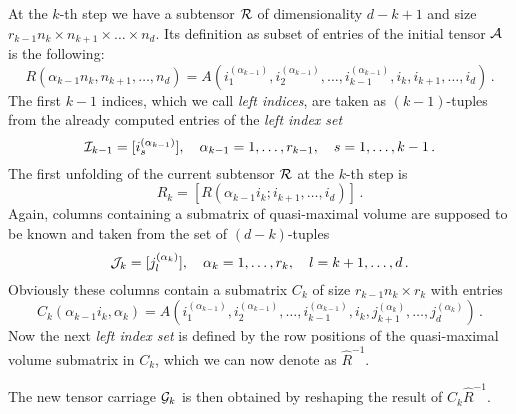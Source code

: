 At the $k$-th step we have a subtensor $\mathcal{R}$ of dimensionality $d-k+1$ and size $r_{k-1}n_k \times n_{k+1} \times \ldots \times n_d$. Its definition as subset of entries of the initial tensor $\mathcal{A}$ is the following:
\begin{equation*}
  R(\alpha_{k-1}n_k,n_{k+1},\ldots,n_d) = A(i_1^{(\alpha_{k-1})},i_2^{(\alpha_{k-1})},\ldots,i_{k-1}^{(\alpha_{k-1})},i_k,i_{k+1},\ldots,i_d)\, .
\end{equation*}
The first $k-1$ indices, which we call \emph{left indices}, are taken as $(k-1)$-tuples from the already computed entries of the \emph{left index set}
\begin{equation*}
  \mathcal{I}_{k-1} = [i_s^{(\alpha_{k-1})}],\quad \alpha_{k-1} = 1,\ldots,r_{k-1},\quad s = 1,\ldots,k-1\, .
\end{equation*}
The first unfolding of the current subtensor $\mathcal{R}$ at the $k$-th step is
\begin{equation*}
  R_k = [R(\alpha_{k-1}i_k;i_{k+1},\ldots,i_d)]\, .
\end{equation*}
Again, columns containing a submatrix of quasi-maximal volume are supposed to be known and taken from the set of $(d-k)$-tuples
\begin{equation*}
  \mathcal{J}_k = [j_l^{(\alpha_k)}],\quad \alpha_k = 1,\ldots,r_k,\quad l = k+1,\ldots,d\, .
\end{equation*}
Obviously these columns contain a submatrix $C_k$ of size $r_{k-1}n_k \times r_k$ with entries
\begin{equation*}
  C_k(\alpha_{k-1}i_k,\alpha_k) = A(i_1^{(\alpha_{k-1})},i_2^{(\alpha_{k-1})},\ldots,i_{k-1}^{(\alpha_{k-1})},i_k,j_{k+1}^{(\alpha_k)},\ldots,j_d^{(\alpha_k)})\, .
\end{equation*}
Now the next \emph{left index set} is defined by the row positions of the quasi-maximal volume submatrix in $C_k$, which we can now denote as $\hat{R}^{-1}$.

The new tensor carriage $\mathcal{G}_k$ is then obtained by reshaping the result of $C_k \hat{R}^{-1}$.

